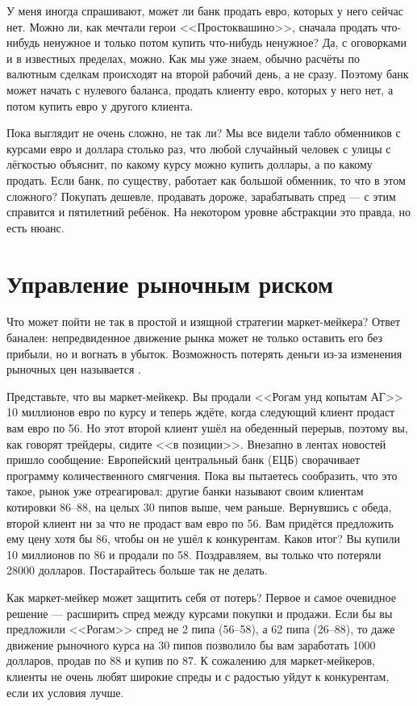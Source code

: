 У меня иногда спрашивают, может ли банк продать евро, которых у него сейчас нет.
Можно ли, как мечтали герои <<Простоквашино>>, сначала продать что-нибудь
ненужное и только потом купить что-нибудь ненужное? Да, с оговорками и в
известных пределах, можно. Как мы уже знаем, обычно расчёты по валютным сделкам
происходят на второй рабочий день, а не сразу. Поэтому банк может начать с
нулевого баланса, продать клиенту евро, которых у него нет, а потом купить евро
у другого клиента.

Пока выглядит не очень сложно, не так ли? Мы все видели табло обменников с
курсами евро и доллара столько раз, что любой случайный человек с улицы с
лёгкостью объяснит, по какому курсу можно купить доллары, а по какому продать.
Если банк, по существу, работает как большой обменник, то что в этом сложного?
Покупать дешевле, продавать дороже, зарабатывать спред --- с этим справится и
пятилетний ребёнок. На некотором уровне абстракции это правда, но есть нюанс.

\section*{Управление рыночным риском}

Что может пойти не так в простой и изящной стратегии маркет-мейкера? Ответ
банален: непредвиденное движение рынка может не только оставить его без прибыли,
но и вогнать в убыток. Возможность потерять деньги из-за изменения рыночных цен
называется .

Представьте, что вы маркет-мейкекр. Вы продали <<Рогам унд копытам АГ>> 10
миллионов евро по курсу  и теперь ждёте, когда следующий
клиент продаст вам евро по 56. Но этот второй клиент ушёл на обеденный перерыв,
поэтому вы, как говорят трейдеры, сидите <<в позиции>>. Внезапно в лентах
новостей пришло сообщение: Европейский центральный банк (ЕЦБ) сворачивает
программу количественного смягчения. Пока вы пытаетесь сообразить, что это
такое, рынок уже отреагировал: другие банки называют своим клиентам котировки
86--88, на целых 30 пипов выше, чем раньше. Вернувшись с обеда, второй клиент ни
за что не продаст вам евро по 56. Вам придётся предложить ему цену хотя бы 86,
чтобы он не ушёл к конкурентам. Каков итог? Вы купили 10 миллионов по 86 и
продали по 58. Поздравляем, вы только что потеряли \num{28 000} долларов.
Постарайтесь больше так не делать.

Как маркет-мейкер может защитить себя от потерь? Первое и самое очевидное
решение --- расширить спред между курсами покупки и продажи. Если бы вы
предложили <<Рогам>> спред не 2 пипа (56--58), а 62 пипа (26--88), то даже
движение рыночного курса на 30 пипов позволило бы вам заработать \num{1000}
долларов, продав по 88 и купив по 87. К сожалению для маркет-мейкеров, клиенты
не очень любят широкие спреды и с радостью уйдут к конкурентам, если их условия
лучше.


